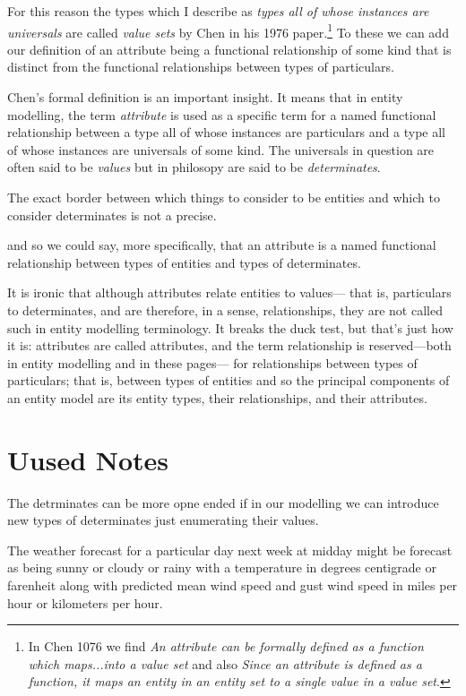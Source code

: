 For this reason the types which I describe as \textit{types all of whose instances are universals} are called \textit{value sets} by Chen in his  1976 paper.\footnote{
In Chen 1076 we find \textit{An attribute can be formally defined as a function which maps...into a value set} and also \textit{Since an attribute is defined as a function, it maps an entity in an entity set to a single value in a value set}.} 
To these we can add our definition of an attribute being a functional relationship of some kind that is distinct from the functional relationships between types of particulars.

\mynote
Chen's formal definition is an important insight.
It means that in entity modelling, the term \textit{attribute} is used as a specific term
for a named functional relationship between a type all of whose instances are particulars  and a type all of whose instances are universals of some kind.
The universals in question are often said to be \textit{values} but 
in philosopy  are said to be \textit{determinates}. 

The exact border between which things to consider to be entities and which to consider determinates is not a precise. 

and so we could say, more specifically, that an attribute is a named functional relationship between types of entities and types of determinates.

It is ironic that although attributes relate entities to values—
that is, particulars to determinates, and are therefore, in a sense, relationships,
they are not called such in entity modelling terminology.
It breaks the duck test, but that’s just how it is:
attributes are called attributes,
and the term relationship is reserved---both in entity modelling and in these pages---
for relationships between types of particulars; that is, between types of entities
and so the principal components of an entity model are its entity types,
their relationships, and their attributes.

\section{Uused Notes}

The detrminates can be more opne ended if in our modelling we can introduce new 
types of determinates just enumerating their values. 


\mynote
The weather forecast for a particular day next week at midday 
might be forecast as being sunny or cloudy or rainy with a temperature in degrees 
centigrade or farenheit along with predicted mean wind speed and gust wind speed
in miles per hour or kilometers per hour.

